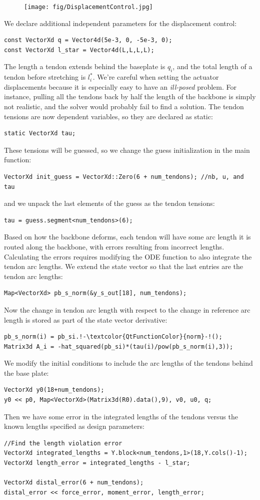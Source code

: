 \documentclass[12pt]{article}
\begin{document}
\begin{figure}[h]
	\centering
		\texttt{[image: fig/DisplacementControl.jpg]}
\end{figure}

We declare additional independent parameters for the displacement control:
\begin{lstlisting}
const VectorXd q = Vector4d(5e-3, 0, -5e-3, 0);
const VectorXd l_star = Vector4d(L,L,L,L);
\end{lstlisting}
The length a tendon extends behind the baseplate is $q_i$, and the total length of a tendon before stretching is $l_i^*$. We're careful when setting the actuator displacements because it is especially easy to have an \emph{ill-posed} problem. For instance, pulling all the tendons back by half the length of the backbone is simply not realistic, and the solver would probably fail to find a solution.
The tendon tensions are now dependent variables, so they are declared as static:
\begin{lstlisting}
static VectorXd tau;
\end{lstlisting}
These tensions will be guessed, so we change the guess initialization in the main function:
\begin{lstlisting}
VectorXd init_guess = VectorXd::Zero(6 + num_tendons); //nb, u, and tau
\end{lstlisting}
and we unpack the last elements of the guess as the tendon tensions:
\begin{lstlisting}
tau = guess.segment<num_tendons>(6);
\end{lstlisting}
Based on how the backbone deforms, each tendon will have some arc length it is routed along the backbone, with errors resulting from incorrect lengths. Calculating the errors requires modifying the ODE function to also integrate the tendon arc lengths. We extend the state vector so that the last entries are the tendon arc lengths: 
\begin{lstlisting}
Map<VectorXd> pb_s_norm(&y_s_out[18], num_tendons);
\end{lstlisting}
Now the change in tendon arc length with respect to the change in reference arc length is stored as part of the state vector derivative:
\begin{lstlisting}
pb_s_norm(i) = pb_si.!-\textcolor{QtFunctionColor}{norm}-!();
Matrix3d A_i = -hat_squared(pb_si)*(tau(i)/pow(pb_s_norm(i),3));
\end{lstlisting}
We modify the initial conditions to include the arc lengths of the tendons behind the base plate:
\begin{lstlisting}
VectorXd y0(18+num_tendons);
y0 << p0, Map<VectorXd>(Matrix3d(R0).data(),9), v0, u0, q;
\end{lstlisting}
Then we have some error in the integrated lengths of the tendons versus the known lengths specified as design parameters:
\begin{lstlisting}
//Find the length violation error
VectorXd integrated_lengths = Y.block<num_tendons,1>(18,Y.cols()-1);
VectorXd length_error = integrated_lengths - l_star;

VectorXd distal_error(6 + num_tendons);
distal_error << force_error, moment_error, length_error;
\end{lstlisting}
\end{document}
